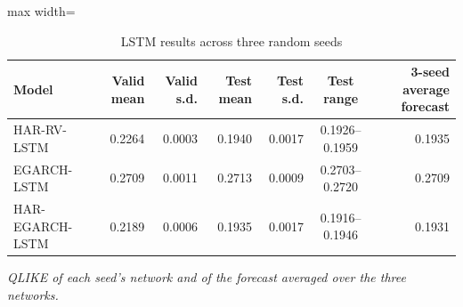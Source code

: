 \begin{table}[H]
\centering
\caption{LSTM results across three random seeds}
\label{tab:seeds}
\small
\begin{adjustbox}{max width=\textwidth}
\begin{tabular}{lrrrrcr}
\toprule
Model & Valid mean & Valid s.d. & Test mean & Test s.d. & Test range & 3-seed average forecast \\
\midrule
HAR-RV-LSTM & 0.2264 & 0.0003 & 0.1940 & 0.0017 & 0.1926--0.1959 & 0.1935 \\
EGARCH-LSTM & 0.2709 & 0.0011 & 0.2713 & 0.0009 & 0.2703--0.2720 & 0.2709 \\
HAR-EGARCH-LSTM & 0.2189 & 0.0006 & 0.1935 & 0.0017 & 0.1916--0.1946 & 0.1931 \\
\bottomrule
\end{tabular}
\end{adjustbox}
\par\smallskip\parbox{0.95\textwidth}{\footnotesize\itshape QLIKE of each seed's network and of the forecast averaged over the three networks.}
\end{table}
